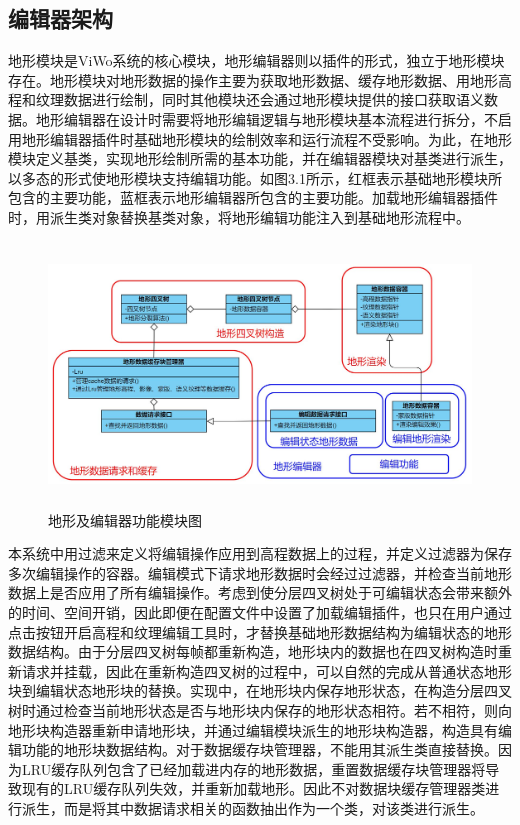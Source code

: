\subsection{编辑器架构}
地形模块是ViWo系统的核心模块，地形编辑器则以插件的形式，独立于地形模块存在。地形模块对地形数据的操作主要为获取地形数据、缓存地形数据、用地形高程和纹理数据进行绘制，同时其他模块还会通过地形模块提供的接口获取语义数据。地形编辑器在设计时需要将地形编辑逻辑与地形模块基本流程进行拆分，不启用地形编辑器插件时基础地形模块的绘制效率和运行流程不受影响。为此，在地形模块定义基类，实现地形绘制所需的基本功能，并在编辑器模块对基类进行派生，以多态的形式使地形模块支持编辑功能。如图3.1所示，红框表示基础地形模块所包含的主要功能，蓝框表示地形编辑器所包含的主要功能。加载地形编辑器插件时，用派生类对象替换基类对象，将地形编辑功能注入到基础地形流程中。\par

\begin{figure}[htbp]
\centering
\includegraphics[height=7cm,width=13.2cm]{figures/editorStructure.JPG}
\caption{地形及编辑器功能模块图}
\end{figure}
本系统中用过滤\supercite{summer}来定义将编辑操作应用到高程数据上的过程，并定义过滤器为保存多次编辑操作的容器。编辑模式下请求地形数据时会经过过滤器，并检查当前地形数据上是否应用了所有编辑操作。考虑到使分层四叉树处于可编辑状态会带来额外的时间、空间开销，因此即便在配置文件中设置了加载编辑插件，也只在用户通过点击按钮开启高程和纹理编辑工具时，才替换基础地形数据结构为编辑状态的地形数据结构。由于分层四叉树每帧都重新构造，地形块内的数据也在四叉树构造时重新请求并挂载，因此在重新构造四叉树的过程中，可以自然的完成从普通状态地形块到编辑状态地形块的替换。实现中，在地形块内保存地形状态，在构造分层四叉树时通过检查当前地形状态是否与地形块内保存的地形状态相符。若不相符，则向地形块构造器重新申请地形块，并通过编辑模块派生的地形块构造器，构造具有编辑功能的地形块数据结构。对于数据缓存块管理器，不能用其派生类直接替换。因为LRU缓存队列包含了已经加载进内存的地形数据，重置数据缓存块管理器将导致现有的LRU缓存队列失效，并重新加载地形。因此不对数据块缓存管理器类进行派生，而是将其中数据请求相关的函数抽出作为一个类，对该类进行派生。
